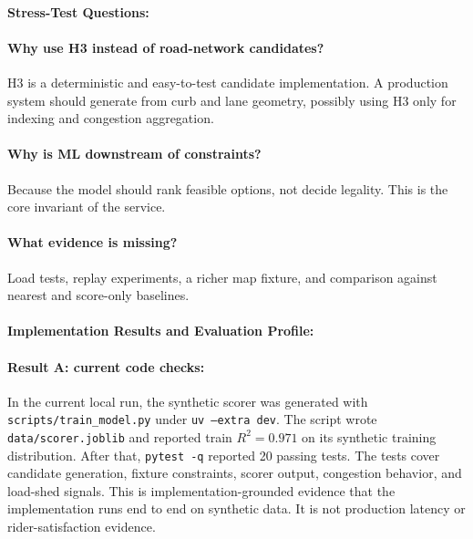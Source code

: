 \documentclass{article}
\begin{document}
\paragraph{Stress-Test Questions:}

\paragraph{Why use H3 instead of road-network candidates?}
H3 is a deterministic and easy-to-test candidate implementation. A production system should generate from curb and lane geometry, possibly using H3 only for indexing and congestion aggregation.

\paragraph{Why is ML downstream of constraints?}
Because the model should rank feasible options, not decide legality. This is the core invariant of the service.

\paragraph{What evidence is missing?}
Load tests, replay experiments, a richer map fixture, and comparison against nearest and score-only baselines.

\paragraph{Implementation Results and Evaluation Profile:}

\paragraph{Result A: current code checks:}

In the current local run, the synthetic scorer was generated with \texttt{scripts/train\_model.py} under \texttt{uv --extra dev}. The script wrote \texttt{data/scorer.joblib} and reported train $R^2=0.971$ on its synthetic training distribution. After that, \texttt{pytest -q} reported 20 passing tests. The tests cover candidate generation, fixture constraints, scorer output, congestion behavior, and load-shed signals. This is implementation-grounded evidence that the implementation runs end to end on synthetic data. It is not production latency or rider-satisfaction evidence.
\end{document}
